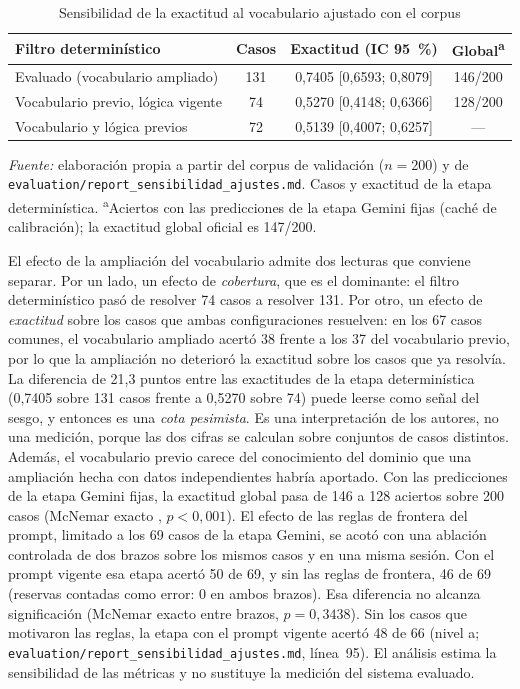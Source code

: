 \begin{table}[htbp]
\centering
\caption{Sensibilidad de la exactitud al vocabulario ajustado con el corpus}
\label{tab:sensibilidad-ajustes}
\footnotesize
\begin{tabular}{@{}l c c c@{}}
\toprule
\textbf{Filtro determinístico} & \textbf{Casos} & \textbf{Exactitud (IC 95~\%)} & \textbf{Global\textsuperscript{a}} \\
\midrule
Evaluado (vocabulario ampliado) & 131 & 0,7405 [0,6593; 0,8079] & 146/200 \\
Vocabulario previo, lógica vigente & 74 & 0,5270 [0,4148; 0,6366] & 128/200 \\
Vocabulario y lógica previos & 72 & 0,5139 [0,4007; 0,6257] & --- \\
\bottomrule
\end{tabular}
\par\smallskip
{\footnotesize\textit{Fuente:} elaboración propia a partir del corpus de validación (\(n = 200\)) y de \texttt{evaluation/report\_sensibilidad\_ajustes.md}. Casos y exactitud de la etapa determinística. \textsuperscript{a}Aciertos con las predicciones de la etapa Gemini fijas (caché de calibración); la exactitud global oficial es 147/200.\par}
\end{table}

El efecto de la ampliación del vocabulario admite dos lecturas que conviene separar. Por un lado, un efecto de \emph{cobertura}, que es el dominante: el filtro determinístico pasó de resolver 74 casos a resolver 131. Por otro, un efecto de \emph{exactitud} sobre los casos que ambas configuraciones resuelven: en los 67 casos comunes, el vocabulario ampliado acertó 38 frente a los 37 del vocabulario previo, por lo que la ampliación no deterioró la exactitud sobre los casos que ya resolvía. La diferencia de 21,3 puntos entre las exactitudes de la etapa determinística (0,7405 sobre 131 casos frente a 0,5270 sobre 74) puede leerse como señal del sesgo, y entonces es una \emph{cota pesimista}. Es una interpretación de los autores, no una medición, porque las dos cifras se calculan sobre conjuntos de casos distintos. Además, el vocabulario previo carece del conocimiento del dominio que una ampliación hecha con datos independientes habría aportado. Con las predicciones de la etapa Gemini fijas, la exactitud global pasa de 146 a 128 aciertos sobre 200 casos (McNemar exacto \parencite{McNemar1947_sampling_error}, \(p < 0{,}001\)). El efecto de las reglas de frontera del prompt, limitado a los 69 casos de la etapa Gemini, se acotó con una ablación controlada de dos brazos sobre los mismos casos y en una misma sesión. Con el prompt vigente esa etapa acertó 50 de 69, y sin las reglas de frontera, 46 de 69 (reservas contadas como error: 0 en ambos brazos). Esa diferencia no alcanza significación (McNemar exacto entre brazos, \(p = 0{,}3438\)). Sin los casos que motivaron las reglas, la etapa con el prompt vigente acertó 48 de 66 (nivel a; \texttt{evaluation/report\_sensibilidad\_ajustes.md}, línea~95). El análisis estima la sensibilidad de las métricas y no sustituye la medición del sistema evaluado.

